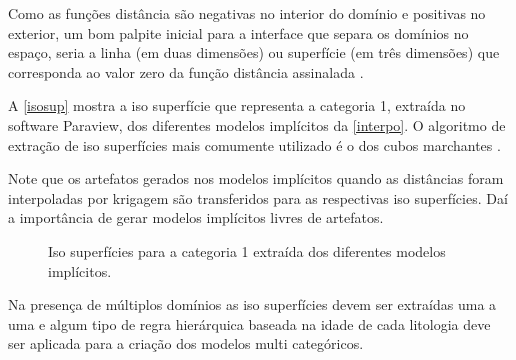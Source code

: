 Como as funções distância são negativas no interior do domínio e positivas no exterior, um bom palpite inicial para a interface que separa os domínios no espaço, seria a linha (em duas dimensões) ou superfície (em três dimensões) que corresponda ao valor zero da função distância assinalada \cite{wildedeutschcalibrate}. 

A \autoref{isosup} mostra a iso superfície que representa a categoria 1, extraída no software Paraview, dos diferentes modelos implícitos da \autoref{interpo}. O algoritmo de extração de iso superfícies mais comumente utilizado é o dos cubos marchantes \cite{lorensen1987marching}. 

Note que os artefatos gerados nos modelos implícitos quando as distâncias foram interpoladas por krigagem são transferidos para as respectivas iso superfícies. Daí a importância de gerar modelos implícitos livres de artefatos.


\begin{figure} 
    \caption{Iso superfícies para a categoria 1 extraída dos diferentes modelos implícitos.} \label{isosup}
     \centering
\end{figure}

Na presença de múltiplos domínios as iso superfícies devem ser extraídas uma a uma e algum tipo de regra hierárquica baseada na idade de cada litologia deve ser aplicada para a criação dos modelos multi categóricos.

